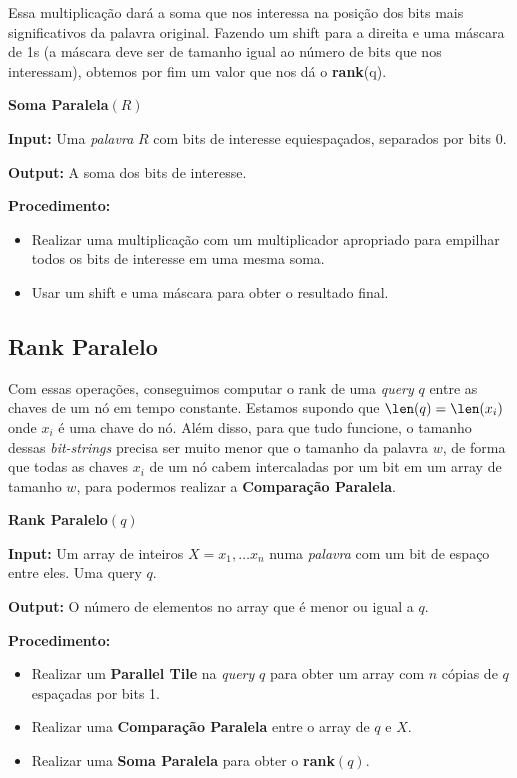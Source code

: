 Essa multiplicação dará a soma que nos interessa na posição dos bits mais
significativos da palavra original. Fazendo um shift para a direita e uma
máscara de 1s (a máscara deve ser de tamanho igual ao número de bits que nos
interessam), obtemos por fim um valor que nos dá o \textbf{rank}(q).

\textbf{Soma Paralela}$(R)$

\textbf{Input:} Uma \textit{palavra} $R$ com bits de interesse equiespaçados,
separados por bits 0.

\textbf{Output:} A soma dos bits de interesse.

\textbf{Procedimento:} 
\begin{itemize}
\item Realizar uma multiplicação com um multiplicador apropriado para
empilhar todos os bits de interesse em uma mesma soma. 
\item Usar um shift e uma máscara para obter o resultado final.
\end{itemize}

\subsection{Rank Paralelo}

Com essas operações, conseguimos computar o rank de uma \textit{query} $q$ entre
as chaves de um nó em tempo constante. Estamos supondo que $\len(q) = \len(x_i)$
onde $x_i$ é uma chave do nó. Além disso, para que tudo funcione, o tamanho
dessas \textit{bit-strings} precisa ser muito menor que o tamanho da palavra
$w$, de forma que todas as chaves $x_i$ de um nó cabem intercaladas por um bit
em um array de tamanho $w$, para podermos realizar a \textbf{Comparação
Paralela}.

\textbf{Rank Paralelo}$(q)$

\textbf{Input:} Um array de inteiros $X = x_1,\dots x_n$ numa \textit{palavra}
com um bit de espaço entre eles. Uma query $q$.

\textbf{Output:} O número de elementos no array que é menor ou igual a $q$.

\textbf{Procedimento:}
\begin{itemize}
    \item Realizar um \textbf{Parallel Tile} na \textit{query} $q$ para obter um
    array com $n$ cópias de $q$ espaçadas por bits 1.
    \item Realizar uma \textbf{Comparação Paralela} entre o array de $q$ e $X$.
    \item Realizar uma \textbf{Soma Paralela} para obter o \textbf{rank}$(q)$.
\end{itemize}


